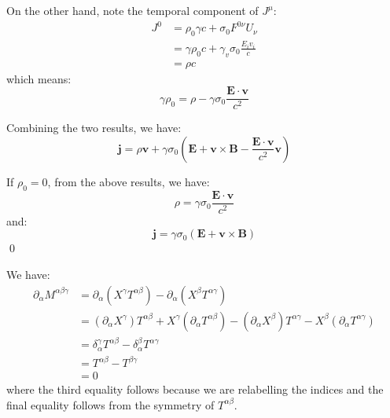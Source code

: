 \documentclass[12pt]{article}
\begin{document}
On the other hand, note the temporal component of $J^{\mu}$:
\begin{equation}
    \begin{split}
        J^{0} &= \rho_{0} \gamma c + \sigma_{0} F^{0\nu} U_{\nu} \\
        &= \gamma \rho_{0} c + \gamma_{v} \sigma_{0} \frac{E_{i} v_{i}}{c} \\
        &= \rho c
    \end{split}
\end{equation}
which means:
\begin{equation}
    \gamma \rho_{0} = \rho - \gamma \sigma_{0} \frac{\mathbf{E} \cdot \mathbf{v}}{c^{2}}
\end{equation}

Combining the two results, we have:
\begin{equation}
    \mathbf{j} = \rho \mathbf{v} + \gamma \sigma_{0} \left( \mathbf{E} + \mathbf{v} \times \mathbf{B} - \frac{\mathbf{E} \cdot \mathbf{v}}{c^{2}} \mathbf{v} \right)
\end{equation}

If $\rho_{0} = 0$, from the above results, we have:
\begin{equation}
    \rho = \gamma \sigma_{0} \frac{\mathbf{E} \cdot \mathbf{v}}{c^{2}}
\end{equation}
and:
\begin{equation}
    \mathbf{j} = \gamma \sigma_{0} \left( \mathbf{E} + \mathbf{v} \times \mathbf{B} \right)
\end{equation}
\qed



We have:
\begin{equation}
    \begin{split}
        \partial_{\alpha} M^{\alpha \beta \gamma} &= \partial_{\alpha} (X^{\gamma} T^{\alpha \beta}) - \partial_{\alpha} (X^{\beta} T^{\alpha \gamma}) \\
        &= (\partial_{\alpha} X^{\gamma}) T^{\alpha \beta} + X^{\gamma} (\partial_{\alpha} T^{\alpha \beta}) - (\partial_{\alpha} X^{\beta}) T^{\alpha \gamma} - X^{\beta} (\partial_{\alpha} T^{\alpha \gamma}) \\
        &= \delta^{\gamma}_{\alpha} T^{\alpha \beta} - \delta^{\beta}_{\alpha} T^{\alpha \gamma} \\
        &= T^{\alpha \beta} - T^{\beta \gamma} \\
        &= 0
    \end{split}
\end{equation}
where the third equality follows because we are relabelling the indices and the final equality follows from the symmetry of $T^{\alpha \beta}$.
\end{document}
